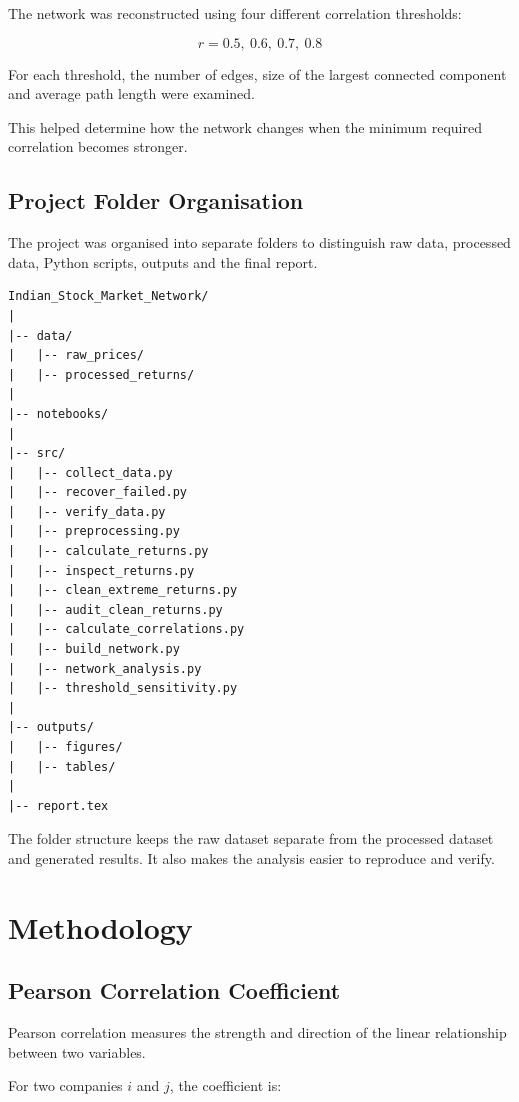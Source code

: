 \documentclass[11pt,a4paper]{article}
\begin{document}
The network was reconstructed using four different
correlation thresholds:

\[
r = 0.5,\ 0.6,\ 0.7,\ 0.8
\]

For each threshold, the number of edges, size of the
largest connected component and average path length
were examined.

This helped determine how the network changes when
the minimum required correlation becomes stronger.

\subsection{Project Folder Organisation}

The project was organised into separate folders to
distinguish raw data, processed data, Python scripts,
outputs and the final report.

\begin{lstlisting}
Indian_Stock_Market_Network/
|
|-- data/
|   |-- raw_prices/
|   |-- processed_returns/
|
|-- notebooks/
|
|-- src/
|   |-- collect_data.py
|   |-- recover_failed.py
|   |-- verify_data.py
|   |-- preprocessing.py
|   |-- calculate_returns.py
|   |-- inspect_returns.py
|   |-- clean_extreme_returns.py
|   |-- audit_clean_returns.py
|   |-- calculate_correlations.py
|   |-- build_network.py
|   |-- network_analysis.py
|   |-- threshold_sensitivity.py
|
|-- outputs/
|   |-- figures/
|   |-- tables/
|
|-- report.tex
\end{lstlisting}

The folder structure keeps the raw dataset separate from
the processed dataset and generated results. It also
makes the analysis easier to reproduce and verify.

\section{Methodology}

\subsection{Pearson Correlation Coefficient}

Pearson correlation measures the strength and direction
of the linear relationship between two variables.

For two companies $i$ and $j$, the coefficient is:
\end{document}
